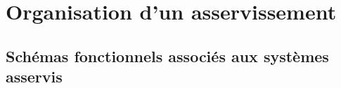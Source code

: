 \section{Organisation d'un asservissement}

\subsection{Schémas fonctionnels associés aux systèmes asservis}

\begin{figure}[!h]
%                                      


\end{figure}
